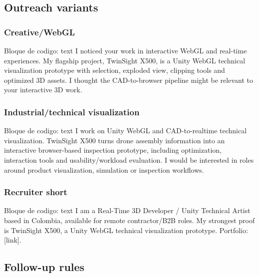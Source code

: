 \subsection{Outreach variants}


\subsubsection{Creative/WebGL}


\begin{mdcode}
Bloque de codigo: text
I noticed your work in interactive WebGL and real-time experiences. My flagship project, TwinSight X500, is a Unity WebGL technical visualization prototype with selection, exploded view, clipping tools and optimized 3D assets. I thought the CAD-to-browser pipeline might be relevant to your interactive 3D work.
\end{mdcode}


\subsubsection{Industrial/technical visualization}


\begin{mdcode}
Bloque de codigo: text
I work on Unity WebGL and CAD-to-realtime technical visualization. TwinSight X500 turns drone assembly information into an interactive browser-based inspection prototype, including optimization, interaction tools and usability/workload evaluation. I would be interested in roles around product visualization, simulation or inspection workflows.
\end{mdcode}


\subsubsection{Recruiter short}


\begin{mdcode}
Bloque de codigo: text
I am a Real-Time 3D Developer / Unity Technical Artist based in Colombia, available for remote contractor/B2B roles. My strongest proof is TwinSight X500, a Unity WebGL technical visualization prototype. Portfolio: [link].
\end{mdcode}


\subsection{Follow-up rules}


